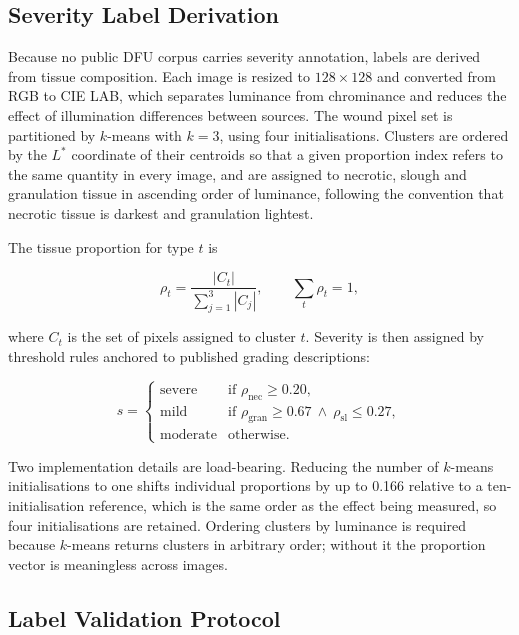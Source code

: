 \subsection{Severity Label Derivation}

Because no public DFU corpus carries severity annotation, labels are
derived from tissue composition. Each image is resized to $128 \times 128$
and converted from RGB to CIE LAB, which separates luminance from
chrominance and reduces the effect of illumination differences between
sources. The wound pixel set is partitioned by $k$-means with $k = 3$,
using four initialisations. Clusters are ordered by the $L^{*}$ coordinate
of their centroids so that a given proportion index refers to the same
quantity in every image, and are assigned to necrotic, slough and
granulation tissue in ascending order of luminance, following the
convention that necrotic tissue is darkest and granulation lightest.

The tissue proportion for type $t$ is

\begin{equation}
\rho_t = \frac{|C_t|}{\sum_{j=1}^{3} |C_j|},
\qquad \sum_t \rho_t = 1,
\label{eq:props}
\end{equation}

where $C_t$ is the set of pixels assigned to cluster $t$. Severity is then
assigned by threshold rules anchored to published grading descriptions:

\begin{equation}
s =
\begin{cases}
\text{severe}   & \text{if } \rho_{\text{nec}} \geq 0.20, \\[2pt]
\text{mild}     & \text{if } \rho_{\text{gran}} \geq 0.67
                   \ \wedge\ \rho_{\text{sl}} \leq 0.27, \\[2pt]
\text{moderate} & \text{otherwise.}
\end{cases}
\label{eq:rule}
\end{equation}

Two implementation details are load-bearing. Reducing the number of
$k$-means initialisations to one shifts individual proportions by up to
0.166 relative to a ten-initialisation reference, which is the same order
as the effect being measured, so four initialisations are retained.
Ordering clusters by luminance is required because $k$-means returns
clusters in arbitrary order; without it the proportion vector is
meaningless across images.

\subsection{Label Validation Protocol}


